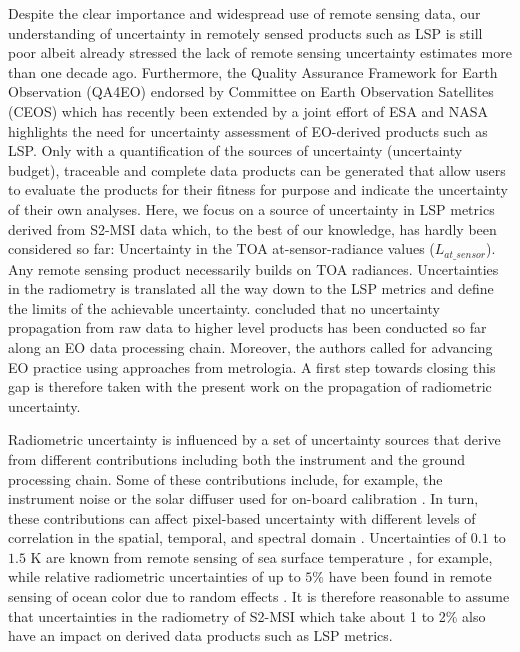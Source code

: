 Despite the clear importance and widespread use of remote sensing data, our understanding of uncertainty in remotely sensed products such as \gls{LSP} is still poor albeit \cite{white_real-time_2006} already stressed the lack of remote sensing uncertainty estimates more than one decade ago. Furthermore, the Quality Assurance Framework for Earth Observation (QA4EO) endorsed by Committee on Earth Observation Satellites (CEOS) which has recently been extended by a joint effort of ESA and NASA \citep{hunt_quality_2021} highlights the need for uncertainty assessment of \gls{EO}-derived products such as \gls{LSP}. Only with a quantification of the sources of uncertainty (uncertainty budget), traceable and complete data products can be generated that allow users to evaluate the products for their fitness for purpose and indicate the uncertainty of their own analyses. Here, we focus on a source of uncertainty in \gls{LSP} metrics derived from \gls{S2}-\gls{MSI} data which, to the best of our knowledge, has hardly been considered so far: Uncertainty in the \gls{TOA} at-sensor-radiance values ($L_{at\_sensor}$). Any remote sensing product necessarily builds on \gls{TOA} radiances. Uncertainties in the radiometry is translated all the way down to the \gls{LSP} metrics and define the limits of the achievable uncertainty. \cite{mittaz_applying_2019} concluded that no uncertainty propagation from raw data to higher level products has been conducted so far along an \gls{EO} data processing chain. Moreover, the authors called for advancing \gls{EO} practice using approaches from metrologia. A first step towards closing this gap is therefore taken with the present work on the propagation of radiometric uncertainty.

Radiometric uncertainty is influenced by a set of uncertainty sources that derive from different contributions including both the instrument and the ground processing chain. Some of these contributions include, for example, the instrument noise or the solar diffuser used for on-board calibration \citep{gorrono_radiometric_2017}. In turn, these contributions can affect pixel-based uncertainty with different levels of correlation in the spatial, temporal, and spectral domain \citep{gorrono_providing_2018}. Uncertainties of $0.1$ to $1.5$ K are known from remote sensing of sea surface temperature \citep{merchant_sea_2014}, for example, while relative radiometric uncertainties of up to $5\%$ have been found in remote sensing of ocean color due to random effects \citep{melin_uncertainty_2016,mckinna_approach_2019}. It is therefore reasonable to assume that uncertainties in the radiometry of \gls{S2}-\gls{MSI} which take about 1 to 2\% \citep{gorrono_providing_2018} also have an impact on derived data products such as \gls{LSP} metrics.


